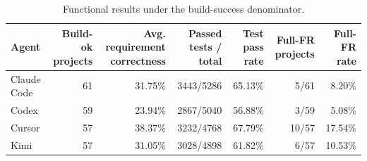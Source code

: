 \begin{table}[t]
\centering
\small
\caption{Functional results under the build-success denominator.}
\label{tab:rq2-functional-details}
\begin{tabular}{lrrrrrr}
\toprule
Agent & Build-ok projects & Avg. requirement correctness & Passed tests / total & Test pass rate & Full-FR projects & Full-FR rate \\
\midrule
Claude Code & 61 & 31.75\% & 3443/5286 & 65.13\% & 5/61 & 8.20\% \\
Codex & 59 & 23.94\% & 2867/5040 & 56.88\% & 3/59 & 5.08\% \\
Cursor & 57 & 38.37\% & 3232/4768 & 67.79\% & 10/57 & 17.54\% \\
Kimi & 57 & 31.05\% & 3028/4898 & 61.82\% & 6/57 & 10.53\% \\
\bottomrule
\end{tabular}
\end{table}
